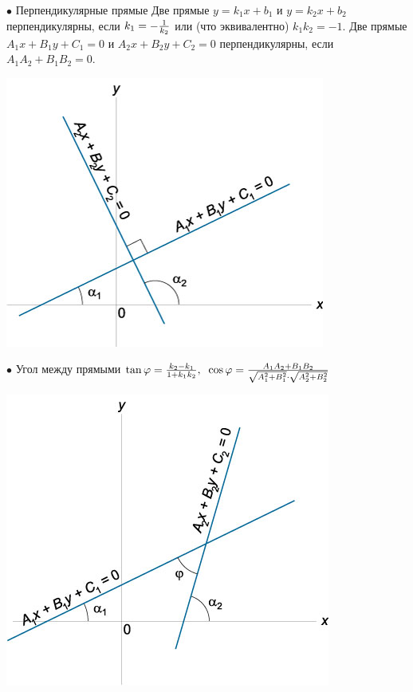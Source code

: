 \documentclass[oneside]{book}
\begin{document}
\begin{itemize}
\begin{enumerate}
$\bullet$ Перпендикулярные прямые
Две прямые $y = {k_1}x + {b_1} $ и $ y = {k_2}x + {b_2}$ перпендикулярны, если
${k_1} = - \large\frac{1}{{{k_2}}}\normalsize$ или (что эквивалентно) ${k_1}{k_2} = - 1$.
Две прямые ${A_1}x + {B_1}y + {C_1} = 0$ и ${A_2}x + {B_2}y + {C_2} = 0$ перпендикулярны, если
${A_1}{A_2} + {B_1}{B_2} = 0$.
\begin{center}
\includegraphics[scale=0.4]{./pics/16.jpg}
\end{center}

$\bullet$ Угол между прямыми  
$\tan \varphi = \large\frac{{{k_2} - {k_1}}}{{1 + {k_1}{k_2}}}\normalsize,\;\;\cos \varphi = \large\frac{{{A_1}{A_2} + {B_1}{B_2}}}{{\sqrt {A_1^2 + B_1^2} \cdot \sqrt {A_2^2 + B_2^2} }}\normalsize$
\begin{center}
\includegraphics[scale=0.4]{./pics/17.jpg}
\end{center}


\end{enumerate}
\end{itemize}
\end{document}
